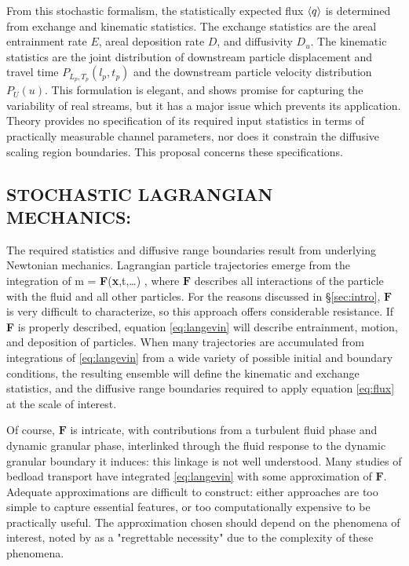 From this stochastic formalism, the statistically expected flux $\langle q \rangle$ is determined from exchange and kinematic statistics. The exchange statistics are the areal entrainment rate $E$, areal deposition rate $D$, and diffusivity $D_u$. The kinematic statistics are the joint distribution of downstream particle displacement and travel time $P_{L_p,T_p}(l_p,t_p)$ and the downstream particle velocity distribution $P_U(u)$. This formulation is elegant, and shows promise for capturing the variability of real streams, but it has a major issue which prevents its application. Theory provides no specification of its required input statistics in terms of practically measurable channel parameters, nor does it constrain the  diffusive scaling region boundaries. This proposal concerns these specifications. 


\subsection{STOCHASTIC LAGRANGIAN MECHANICS:}\label{sec:lagrangianbackground}

The required statistics and diffusive range boundaries result from underlying Newtonian mechanics. Lagrangian particle trajectories emerge from the integration of 
\be m  = \textbf{F}(\textbf{x},t,\dots) \label{eq:langevin},\ee
where $\textbf{F}$ describes all interactions of the particle with the fluid and all other particles. For the reasons discussed in \S \ref{sec:intro}, $\textbf{F}$ is very difficult to characterize, so this approach offers considerable resistance. If \textbf{F} is properly described, equation \ref{eq:langevin} will describe entrainment, motion, and deposition of particles. When many trajectories are accumulated from integrations of \ref{eq:langevin} from a wide variety of possible initial and boundary conditions, the resulting ensemble will define the kinematic and exchange statistics, and the diffusive range boundaries required to apply equation \ref{eq:flux} at the scale of interest. 
\bigskip 


Of course, $\textbf{F}$ is intricate, with contributions from a turbulent fluid phase and dynamic granular phase, interlinked through the fluid response to the dynamic granular boundary it induces: this linkage is not well understood. Many studies of bedload transport have integrated \ref{eq:langevin} with some approximation of $\textbf{F}$. Adequate approximations are difficult to construct: either approaches are too simple to capture essential features, or too computationally expensive to be practically useful. The approximation chosen should depend on the phenomena of interest, noted by \cite{Murray2003} as a "regrettable necessity" due to the complexity of these phenomena. 
\bigskip 


